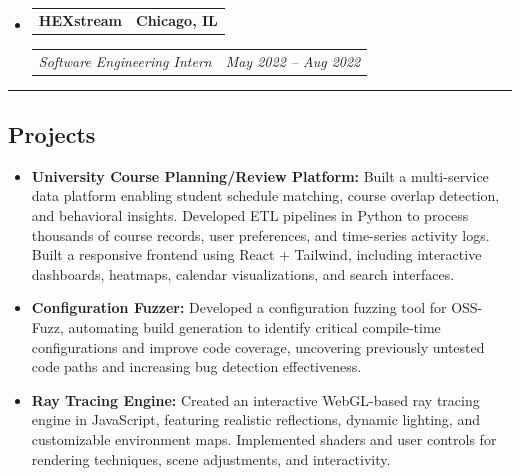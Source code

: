 \documentclass[11pt,letterpaper]{article}
\makeatletter
\newcommand{\headerrow}[2]
{\begin{tabular*}{\linewidth}{l@{\extracolsep{\fill}}r}
#1 &
#2 \\
\end{tabular*}}
\makeatother
\begin{document}
\begin{itemize}[leftmargin=1em]
	\item
	      \headerrow
	      {\textbf{HEXstream}}
	      {\textbf{Chicago, IL}}
	      \headerrow
	      {\emph{Software Engineering Intern}}
	      {\emph{May 2022 -- Aug 2022}}
\end{itemize}
\hrule

\vspace{-1em}
\subsection*{\Large Projects}
\begin{itemize}[leftmargin=1em,noitemsep]
    \item \textbf{University Course Planning/Review Platform:} Built a multi-service data platform enabling student schedule matching, course overlap detection, and behavioral insights. Developed ETL pipelines in Python to process thousands of course records, user preferences, and time-series activity logs. Built a responsive frontend using React + Tailwind, including interactive dashboards, heatmaps, calendar visualizations, and search interfaces.
    \item \textbf{Configuration Fuzzer:} Developed a configuration fuzzing tool for OSS-Fuzz, automating build generation to identify critical compile-time configurations and improve code coverage, uncovering previously untested code paths and increasing bug detection effectiveness.
    \item \textbf{Ray Tracing Engine:} Created an interactive WebGL-based ray tracing engine in JavaScript, featuring realistic reflections, dynamic lighting, and customizable environment maps. Implemented shaders and user controls for rendering techniques, scene adjustments, and interactivity.
\end{itemize}
\end{document}
